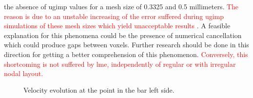\documentclass[preprint,12pt,a4paper]{elsarticle}
\newcommand{\PNA}[1]{
  \textcolor{red}{{#1}}
}
\begin{document}
the absence of \acrshort{ugimp} values for a mesh size of 0.3325 and 0.5
millimeters.\PNA{The reason is due to an unstable
increasing of the error suffered during \acrshort{ugimp} simulations of these mesh sizes which yield unacceptable results}. A feasible
explanation for this phenomena could be the presence of numerical
cancellation which could produce gaps between voxels. Further research
should be done in this direction for getting a better comprehension of
this phenomenon.\PNA{Conversely, this shortcoming is not suffered by \acrshort{lme}, independently of regular or with irregular nodal layout.}
\begin{figure}\sidecaption
  \centering
  \caption{Velocity evolution at the point in the bar left side.}
  \label{fig:Dyka-uGIMP-LME}
\end{figure}
\end{document}
